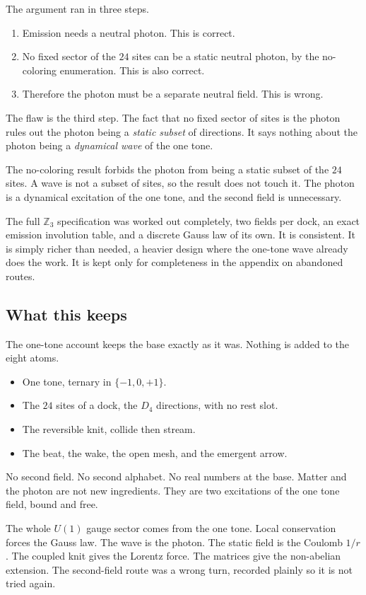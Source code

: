 The argument ran in three steps.

\begin{enumerate}
\item Emission needs a neutral photon. This is correct.
\item No fixed sector of the $24$ sites can be a static neutral photon, by the no-coloring enumeration. This is also correct.
\item Therefore the photon must be a separate neutral field. This is wrong.
\end{enumerate}

The flaw is the third step. The fact that no fixed sector of sites is the photon rules out the photon being a \emph{static subset} of directions. It says nothing about the photon being a \emph{dynamical wave} of the one tone.

\begin{principle}
The no-coloring result forbids the photon from being a static subset of the $24$ sites. A wave is not a subset of sites, so the result does not touch it. The photon is a dynamical excitation of the one tone, and the second field is unnecessary.
\end{principle}

The full $\mathbb{Z}_3$ specification was worked out completely, two fields per dock, an exact emission involution table, and a discrete Gauss law of its own. It is consistent. It is simply richer than needed, a heavier design where the one-tone wave already does the work. It is kept only for completeness in the appendix on abandoned routes.

\subsection{What this keeps}

The one-tone account keeps the base exactly as it was. Nothing is added to the eight atoms.

\begin{itemize}
\item One tone, ternary in $\{-1, 0, +1\}$.
\item The $24$ sites of a dock, the $D_4$ directions, with no rest slot.
\item The reversible knit, collide then stream.
\item The beat, the wake, the open mesh, and the emergent arrow.
\end{itemize}

No second field. No second alphabet. No real numbers at the base. Matter and the photon are not new ingredients. They are two excitations of the one tone field, bound and free.

The whole $U(1)$ gauge sector comes from the one tone. Local conservation forces the Gauss law. The wave is the photon. The static field is the Coulomb $1/r$. The coupled knit gives the Lorentz force. The matrices give the non-abelian extension. The second-field route was a wrong turn, recorded plainly so it is not tried again.
